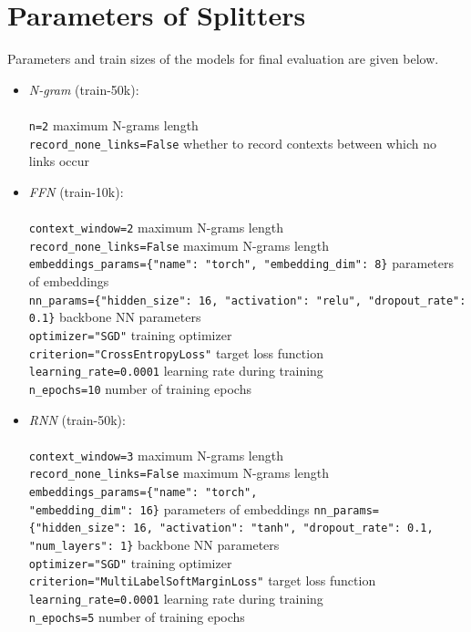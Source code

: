 \documentclass[11pt]{article}
\begin{document}
\section{Parameters of Splitters}
\label{sec:appendix:b}

Parameters and train sizes of the models for final evaluation are given below.

\begin{itemize}
    
    \item \textit{N-gram} (train-50k): \\ \\
    \texttt{n=2} \quad maximum N-grams length \\
    \texttt{record\_none\_links=False} \quad whether to record contexts between which no links occur \\

    \item \textit{FFN} (train-10k): \\ \\
    \texttt{context\_window=2} \quad maximum N-grams length \\
    \texttt{record\_none\_links=False} \quad maximum N-grams length \\
    \texttt{embeddings\_params=\{"name": "torch", "embedding\_dim": 8\}} \quad parameters of embeddings \\
    \texttt{nn\_params=\{"hidden\_size": 16, "activation": "relu", "dropout\_rate": 0.1\}} \quad backbone NN parameters \\
    \texttt{optimizer="SGD"} \quad training optimizer \\
    \texttt{criterion="CrossEntropyLoss"} \quad target loss function \\
    \texttt{learning\_rate=0.0001} \quad learning rate during training \\
    \texttt{n\_epochs=10} \quad number of training epochs \\

    \item \textit{RNN} (train-50k): \\ \\
    \texttt{context\_window=3} \quad maximum N-grams length \\
    \texttt{record\_none\_links=False} \quad maximum N-grams length \\
    \texttt{embeddings\_params=\{"name": "torch",  \\"embedding\_dim": 16\}} \quad parameters of embeddings
    \texttt{nn\_params=\{"hidden\_size": 16, "activation": "tanh", "dropout\_rate": 0.1, "num\_layers": 1\}} \quad backbone NN parameters \\
    \texttt{optimizer="SGD"} \quad training optimizer \\
    \texttt{criterion="MultiLabelSoftMarginLoss"} \quad target loss function \\
    \texttt{learning\_rate=0.0001} \quad learning rate during training \\
    \texttt{n\_epochs=5} \quad number of training epochs \\


\end{itemize}
\end{document}
